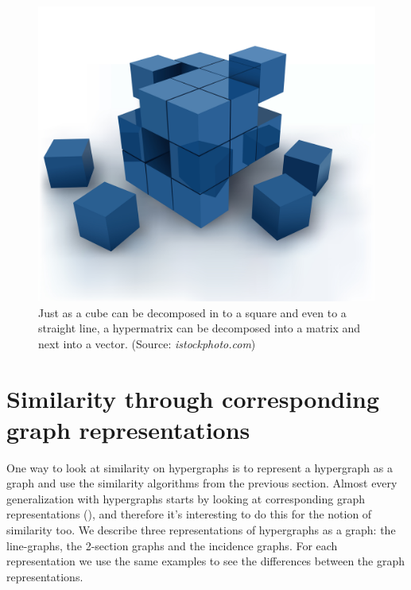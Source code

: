 \documentclass[a4paper,11pt]{report}
\begin{document}
\begin{figure}
  \centering
  \includegraphics[scale=0.05]{cube.jpg}\caption{Just as a cube can be decomposed in to a square and even to a straight line,
  a hypermatrix can be decomposed into a matrix and next into a vector. (Source: \emph{istockphoto.com})}\label{visualizatie}
\end{figure}
 
\section{Similarity through corresponding graph representations}
One way to look at similarity on hypergraphs is to represent a hypergraph as a 
graph and use the similarity algorithms from the previous section. Almost
every generalization with hypergraphs starts by looking at corresponding 
graph representations (\cite{berge}), and therefore it's interesting to do this for the notion of similarity too.
 We describe three representations of 
hypergraphs as a graph: the line-graphs, the 2-section graphs and the incidence 
graphs. For each representation we use the same examples to see the differences between the graph representations. 
\end{document}

